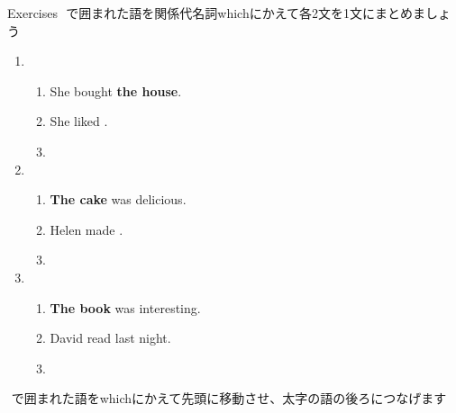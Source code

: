 \documentclass[aspectratio=169,xcolor={dvipsnames,table}]{beamer}
\begin{document}
\begin{frame}[plain]{Exercises}
\fbox{　　}\,\,で囲まれた語を関係代名詞whichにかえて各2文を1文にまとめましょう%
\mbox{}\hfill{\scriptsize {}}
\begin{enumerate}
 \item \begin{enumerate}
	\item She bought {\bfseries the house}.
	\item She liked .
	\item {}
       \end{enumerate} \item \begin{enumerate}
	\item {\bfseries The cake} was delicious.
	\item Helen made .
	\item {}
       \end{enumerate}

 \item \begin{enumerate}
	\item {\bfseries The book} was interesting.
	\item David read  last night.
	\item {}
       \end{enumerate}
\end{enumerate} 

\hfill\fbox{　　}\,\,で囲まれた語をwhichにかえて先頭に移動させ、太字の語の後ろにつなげます
\end{frame}
\end{document}

